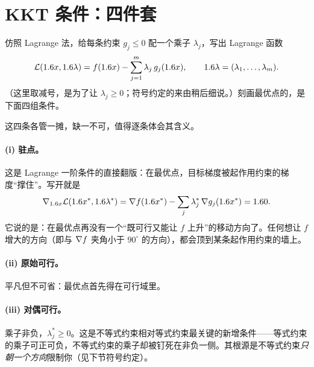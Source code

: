 \section{KKT 条件：四件套}
\label{sec:kkt-2}

仿照 Lagrange 法，给每条约束 $g_j\le0$ 配一个乘子 $\lambda_j$，写出 Lagrange 函数
\[
    \mathcal{L}(1.6 x,1.6\lambda)
    = f(1.6 x)-\sum_{j=1}^{m}\lambda_j\,g_j(1.6 x),
    \qquad 1.6\lambda=(\lambda_1,\dots,\lambda_m) .
\]
（这里取减号，是为了让 $\lambda_j\ge0$；符号约定的来由稍后细说。）刻画最优点的，是下面四组条件。


这四条各管一摊，缺一不可，值得逐条体会其含义。

\paragraph{(i) 驻点。}
这是 Lagrange 一阶条件的直接翻版：在最优点，目标梯度被起作用约束的梯度``撑住''。写开就是
\[
    \nabla_{1.6 x}\mathcal{L}(1.6 x^*,1.6\lambda^*)
    =\nabla f(1.6 x^*)-\sum_{j}\lambda_j^*\,\nabla g_j(1.6 x^*)=1.6 0 .
\]
它说的是：在最优点再没有一个``既可行又能让 $f$ 上升''的移动方向了。任何想让 $f$ 增大的方向（即与 $\nabla f$ 夹角小于 $90^\circ$ 的方向），都会顶到某条起作用约束的墙上。

\paragraph{(ii) 原始可行。}
平凡但不可省：最优点首先得在可行域里。

\paragraph{(iii) 对偶可行。}
乘子非负，$\lambda_j^*\ge0$。这是不等式约束相对等式约束最关键的新增条件——等式约束的乘子可正可负，不等式约束的乘子却被钉死在非负一侧。其根源是不等式约束\emph{只朝一个方向}限制你（见下节符号约定）。

